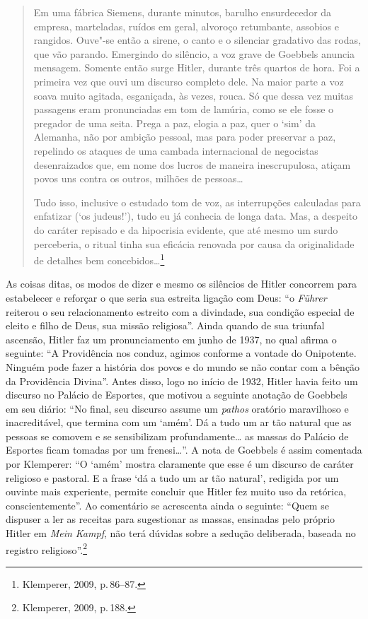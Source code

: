 \begin{quote}
Em uma fábrica Siemens, durante minutos, barulho ensurdecedor da
empresa, marteladas, ruídos em geral, alvoroço retumbante, assobios e
rangidos. Ouve"-se então a sirene, o canto e o silenciar gradativo das
rodas, que vão parando. Emergindo do silêncio, a voz grave de Goebbels
anuncia mensagem. Somente então surge Hitler, durante três quartos de
hora. Foi a primeira vez que ouvi um discurso completo dele. Na maior
parte a voz soava muito agitada, esganiçada, às vezes, rouca. Só que
dessa vez muitas passagens eram pronunciadas em tom de lamúria, como se
ele fosse o pregador de uma seita. Prega a paz, elogia a paz, quer o
`sim' da Alemanha, não por ambição pessoal, mas para poder preservar a
paz, repelindo os ataques de uma cambada internacional de negocistas
desenraizados que, em nome dos lucros de maneira inescrupulosa, atiçam
povos uns contra os outros, milhões de pessoas\ldots{}

Tudo isso, inclusive o estudado tom de voz, as interrupções calculadas
para enfatizar (`os judeus!'), tudo eu já conhecia de longa data. Mas, a
despeito do caráter repisado e da hipocrisia evidente, que até mesmo um
surdo perceberia, o ritual tinha sua eficácia renovada por causa da
originalidade de detalhes bem concebidos\ldots{}\footnote{Klemperer, 2009, p.\,86--87.}
\end{quote}

As coisas ditas, os modos de dizer e mesmo os silêncios de Hitler
concorrem para estabelecer e reforçar o que seria sua estreita ligação
com Deus: ``o \emph{Führer} reiterou o seu relacionamento estreito com a
divindade, sua condição especial de eleito e filho de Deus, sua missão
religiosa''. Ainda quando de sua triunfal ascensão, Hitler faz um
pronunciamento em junho de 1937, no qual afirma o seguinte: ``A
Providência nos conduz, agimos conforme a vontade do Onipotente. Ninguém
pode fazer a história dos povos e do mundo se não contar com a bênção da
Providência Divina''. Antes disso, logo no início de 1932, Hitler havia
feito um discurso no Palácio de Esportes, que motivou a seguinte
anotação de Goebbels em seu diário: ``No final, seu discurso assume um
\emph{pathos} oratório maravilhoso e inacreditável, que termina com um
`amém'. Dá a tudo um ar tão natural que as pessoas se comovem e se
sensibilizam profundamente\ldots{} as massas do Palácio de Esportes ficam
tomadas por um frenesi\ldots{}''. A nota de Goebbels é assim comentada por
Klemperer: ``O `amém' mostra claramente que esse é um discurso de
caráter religioso e pastoral. E a frase `dá a tudo um ar tão natural',
redigida por um ouvinte mais experiente, permite concluir que Hitler fez
muito uso da retórica, conscientemente''. Ao comentário se acrescenta
ainda o seguinte: ``Quem se dispuser a ler as receitas para sugestionar
as massas, ensinadas pelo próprio Hitler em \emph{Mein Kampf}, não terá
dúvidas sobre a sedução deliberada, baseada no registro
religioso''.\footnote{Klemperer, 2009, p.\,188.}

